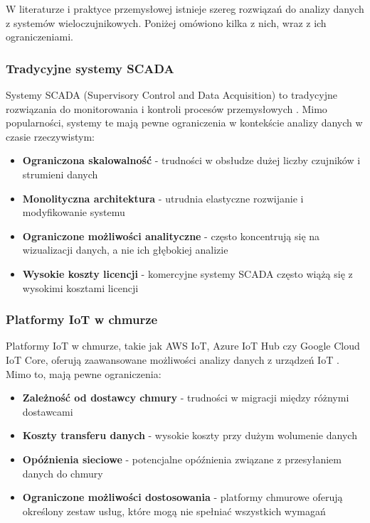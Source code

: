 W literaturze i praktyce przemysłowej istnieje szereg rozwiązań do analizy danych z systemów wieloczujnikowych. Poniżej omówiono kilka z nich, wraz z ich ograniczeniami.

\subsubsection{Tradycyjne systemy SCADA}
\label{subsubsec:scada}

Systemy SCADA (Supervisory Control and Data Acquisition) to tradycyjne rozwiązania do monitorowania i kontroli procesów przemysłowych \citep{scada}. Mimo popularności, systemy te mają pewne ograniczenia w kontekście analizy danych w czasie rzeczywistym:

\begin{itemize}
    \item \textbf{Ograniczona skalowalność} - trudności w obsłudze dużej liczby czujników i strumieni danych
    \item \textbf{Monolityczna architektura} - utrudnia elastyczne rozwijanie i modyfikowanie systemu
    \item \textbf{Ograniczone możliwości analityczne} - często koncentrują się na wizualizacji danych, a nie ich głębokiej analizie
    \item \textbf{Wysokie koszty licencji} - komercyjne systemy SCADA często wiążą się z wysokimi kosztami licencji
\end{itemize}

\subsubsection{Platformy IoT w chmurze}
\label{subsubsec:cloud_iot}

Platformy IoT w chmurze, takie jak AWS IoT, Azure IoT Hub czy Google Cloud IoT Core, oferują zaawansowane możliwości analizy danych z urządzeń IoT \citep{cloud_iot}. Mimo to, mają pewne ograniczenia:

\begin{itemize}
    \item \textbf{Zależność od dostawcy chmury} - trudności w migracji między różnymi dostawcami
    \item \textbf{Koszty transferu danych} - wysokie koszty przy dużym wolumenie danych
    \item \textbf{Opóźnienia sieciowe} - potencjalne opóźnienia związane z przesyłaniem danych do chmury
    \item \textbf{Ograniczone możliwości dostosowania} - platformy chmurowe oferują określony zestaw usług, które mogą nie spełniać wszystkich wymagań
\end{itemize}

